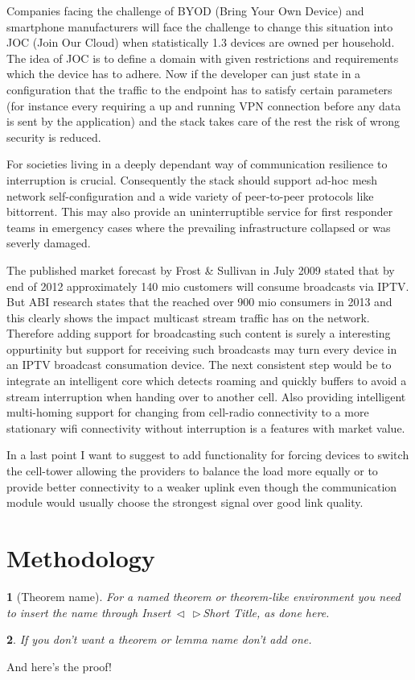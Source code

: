 \documentclass[twocolumn,english]{IEEEtran}
\makeatletter
\DeclareRobustCommand*{\lyxarrow}{%
\@ifstar
{\leavevmode\,$\triangleleft$\,\allowbreak}
{\leavevmode\,$\triangleright$\,\allowbreak}}
\theoremstyle{plain}
\newtheorem{thm}{\protect\theoremname}
\theoremstyle{plain}
\newtheorem{lem}[thm]{\protect\lemmaname}
\providecommand{\lemmaname}{Lemma}
\providecommand{\theoremname}{Theorem}
\makeatother
\begin{document}
Companies facing the challenge of BYOD (Bring Your Own Device) and smartphone
manufacturers will face the challenge to change this situation into JOC (Join
Our Cloud) when statistically 1.3 devices are owned per
household\cite{gartner:predicts-2014-cognizant-computing}. The idea of JOC is
to define a domain with given restrictions and requirements which the device
has to adhere. Now if the developer can just state in a configuration that the
traffic to the endpoint has to satisfy certain parameters (for instance every
requiring a up and running VPN connection before any data is sent by the
application) and the stack takes care of the rest the risk of wrong security
is reduced.

For societies living in a deeply dependant way of communication resilience to
interruption is crucial. Consequently the stack should support ad-hoc mesh
network self-configuration and a wide variety of peer-to-peer protocols like
bittorrent. This may also provide an uninterruptible service for first
responder teams in emergency cases where the prevailing infrastructure
collapsed or was severly damaged.

The published market forecast by Frost \& Sullivan in July
2009\cite{frost:iptv-market} stated that by end of 2012 approximately 140 mio
customers will consume broadcasts via IPTV. But ABI research states that the
reached over 900 mio consumers in 2013\cite{abi:iptv-marketshare} and this
clearly shows the impact multicast stream traffic has on the network.
Therefore adding support for broadcasting such content is surely a interesting
oppurtinity but support for receiving such broadcasts may turn every device in
an IPTV broadcast consumation device. The next consistent step would be to
integrate an intelligent core which detects roaming and quickly buffers to
avoid a stream interruption when handing over to another cell. Also providing
intelligent multi-homing support for changing from cell-radio connectivity to
a more stationary wifi connectivity without interruption is a features with
market value.

In a last point I want to suggest to add functionality for forcing devices to
switch the cell-tower allowing the providers to balance the load more equally
or to provide better connectivity to a weaker uplink even though the
communication module would usually choose the strongest signal over good link
quality.

\section{Methodology}
\begin{thm}[Theorem name]
For a named theorem or theorem-like environment you need to insert
the name through \textsf{Insert\lyxarrow{}Short Title}, as done here.\end{thm}
\begin{lem}
If you don't want a theorem or lemma name don't add one.\end{lem}
\begin{IEEEproof}
And here's the proof!
\end{IEEEproof}
\end{document}

